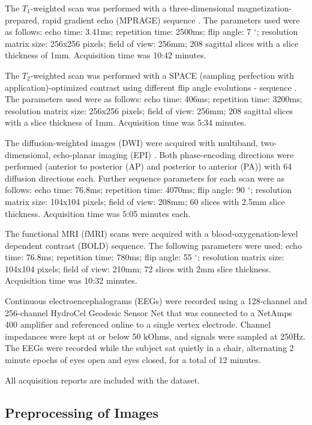 The $T_1$-weighted scan was performed with a three-dimensional magnetization-prepared, rapid gradient echo (MPRAGE) sequence \cite{ref:mprage}. The parameters used were as follows: echo time: 3.41ms; repetition time: 2500ms; flip angle: 7 $^{\circ}$; resolution matrix size: 256x256 pixels; field of view: 256mm; 208 sagittal slices with a slice thickness of 1mm. Acquisition time was 10:42 minutes.

The $T_2$-weighted scan was performed with a SPACE (sampling perfection with application)-optimized contrast using different flip angle evolutions - sequence \cite{ref:space}. The parameters used were as follows: echo time: 406ms; repetition time: 3200ms; resolution matrix size: 256x256 pixels; field of view: 256mm; 208 sagittal slices with a slice thickness of 1mm. Acquisition time was 5:34 minutes.

The diffusion-weighted images (DWI) were acquired with multiband, two-dimensional, echo-planar imaging (EPI) \cite{ref:epi}. Both phase-encoding directions were performed (anterior to posterior (AP) and posterior to anterior (PA)) with 64 diffusion directions each. Further sequence parameters for each scan were as follows: echo time: 76.8ms; repetition time: 4070ms; flip angle: 90 $^{\circ}$; resolution matrix size: 104x104 pixels; field of view: 208mm; 60 slices with 2.5mm slice thickness. Acquisition time was 5:05 minutes each.

The functional MRI (fMRI) scans were acquired with a blood-oxygenation-level dependent contrast (BOLD) sequence. The following parameters were used: echo time: 76.8ms; repetition time: 780ms; flip angle: 55 $^{\circ}$; resolution matrix size: 104x104 pixels; field of view: 210mm; 72 slices with 2mm slice thickness. Acquisition time was 10:32 minutes.

Continuous electroencephalograms (EEGs) were recorded using a 128-channel and 256-channel HydroCel Geodesic Sensor Net that was connected to a NetAmps 400 amplifier and referenced online to a single vertex electrode. Channel impedances were kept at or below 50 kOhms, and signals were sampled at 250Hz. The EEGs were recorded while the subject sat quietly in a chair, alternating 2 minute epochs of eyes open and eyes closed, for a total of 12 minutes.

All acquisition reports are included with the dataset.

\subsection{Preprocessing of Images}
\label{sec:preprocess}

